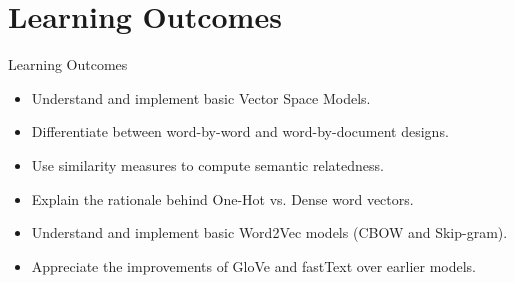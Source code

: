 \section{Learning Outcomes}
\begin{frame}{Learning Outcomes}
    \begin{itemize}
        \setlength{\itemsep}{1em}
        \item Understand and implement basic Vector Space Models.
        \item Differentiate between word-by-word and word-by-document designs.
        \item Use similarity measures to compute semantic relatedness.
        \item Explain the rationale behind One-Hot vs. Dense word vectors.
        \item Understand and implement basic Word2Vec models (CBOW and Skip-gram).
        \item Appreciate the improvements of GloVe and fastText over earlier models.
    \end{itemize}
\end{frame}